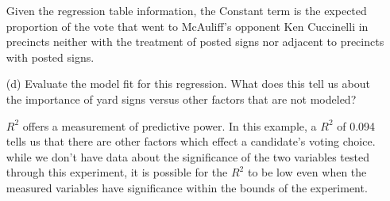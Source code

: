 \documentclass[12pt,letterpaper]{article}
\begin{document}
\begin{enumerate}
Given the regression table information, the Constant term is the expected proportion of the vote that went to McAuliff’s opponent Ken Cuccinelli in precincts neither with the treatment of posted signs nor adjacent to precincts with posted signs.
	
	\item [(d)] Evaluate the model fit for this regression.  What does this	tell us about the importance of yard signs versus other factors that are not modeled?
		\vspace{.5cm}
		
		$R^2$ offers a measurement of predictive power.  In this example, a $R^2$ of 0.094 tells us that there are other factors which effect a candidate's voting choice.  
		while we don't have data about the significance of the two variables tested through this experiment, it is possible for the $R^2$ to be low even when the measured variables have 
		significance within the bounds of the experiment. 
		
		\end{enumerate}  
\end{document}
